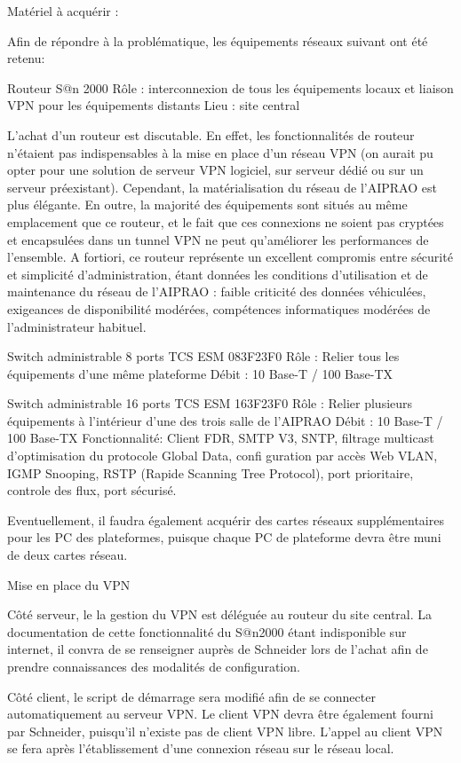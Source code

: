 Matériel à acquérir :

Afin de répondre à la problématique, les équipements réseaux suivant
ont été retenu:

Routeur S@n 2000
Rôle : interconnexion de tous les équipements locaux et liaison VPN pour
    les équipements distants
Lieu : site central

	L'achat d'un routeur est discutable. En effet, les fonctionnalités
de routeur n'étaient pas indispensables à la mise en place d'un réseau
VPN (on aurait pu opter pour une solution de serveur VPN logiciel, sur
serveur dédié ou sur un serveur préexistant).
	Cependant, la matérialisation du réseau de l'AIPRAO est plus élégante.
En outre, la majorité des équipements sont situés au même emplacement que
ce routeur, et le fait que ces connexions ne soient pas cryptées et encapsulées
dans un tunnel VPN ne peut qu'améliorer les performances de l'ensemble.
	A fortiori, ce routeur représente un excellent compromis entre sécurité et
simplicité d'administration, étant données les conditions d'utilisation et de
maintenance du réseau de l'AIPRAO : faible criticité des données véhiculées,
exigeances de disponibilité modérées, compétences informatiques modérées de
l'administrateur habituel.


Switch administrable 8 ports TCS ESM 083F23F0
Rôle : Relier tous les équipements d'une même plateforme
Débit : 10 Base-T / 100 Base-TX


Switch administrable 16 ports TCS ESM 163F23F0
Rôle : Relier plusieurs équipements à l'intérieur d'une des
    trois salle de l'AIPRAO
Débit : 10 Base-T / 100 Base-TX
Fonctionnalité: Client FDR, SMTP V3, SNTP, filtrage multicast d’optimisation du
protocole Global Data, confi guration par accès Web VLAN, IGMP Snooping,
RSTP (Rapide Scanning Tree Protocol), port prioritaire, controle des flux,
port sécurisé.


Eventuellement, il faudra également acquérir des cartes réseaux supplémentaires
pour les PC des plateformes, puisque chaque PC de plateforme devra être muni de
deux cartes réseau.

 Mise en place du VPN

	Côté serveur, le la gestion du VPN est déléguée au routeur du site central. La documentation de cette fonctionnalité du S@n2000 étant indisponible sur internet, il convra de se renseigner auprès de Schneider lors de l'achat afin de prendre connaissances des modalités de configuration.

	Côté client, le script de démarrage sera modifié afin de se connecter automatiquement au serveur VPN. Le client VPN devra être également fourni par Schneider, puisqu'il n'existe pas de client VPN libre. L'appel au client VPN se fera après l'établissement d'une connexion réseau sur le réseau local.

